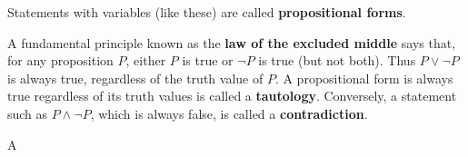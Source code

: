 \documentclass[12pt,a4paper]{article}
\begin{document}
Statements with variables (like these) are called \textbf{propositional forms}.

\bigbreak

A fundamental principle known as the \textbf{law of the excluded middle} says that, for any proposition $P$, either $P$ is true or $\neg P$ is true (but not both). Thus $P\vee\neg P$ is always true, regardless of the truth value of $P$. A propositional form is always true regardless of its truth values is called a \textbf{tautology}. Conversely, a statement such as $P\wedge\neg P$, which is always false, is called a \textbf{contradiction}.

\bigbreak

A
\end{document}
